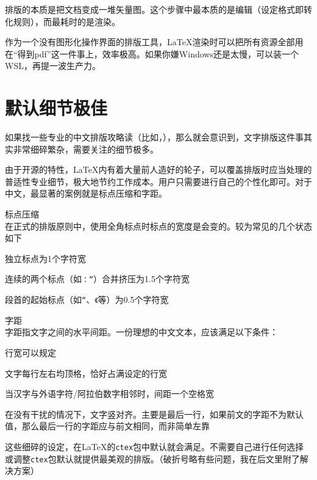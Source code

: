 \documentclass[10pt,openany]{book}
\begin{document}
\begin{sloppypar}
排版的本质是把文档变成一堆矢量图。这个步骤中最本质的是编辑（设定格式即转化规则），而最耗时的是渲染。

作为一个没有图形化操作界面的排版工具，{\LaTeX}渲染时可以把所有资源全部用在“得到pdf”这一件事上，效率极高。如果你嫌Windows还是太慢，可以装一个WSL，再提一波生产力。

\section{默认细节极佳}

如果找一些专业的中文排版攻略读（比如，），那么就会意识到，文字排版这件事其实非常细碎繁杂，需要关注的细节极多。

由于开源的特性，{\LaTeX}内有着大量前人造好的轮子，可以覆盖排版时应当处理的普适性专业细节，极大地节约工作成本。用户只需要进行自己的个性化即可。对于中文，最显著的案例就是标点压缩和字距。

\begin{tightitem}
    \item 标点压缩\\在正式的排版原则中，使用全角标点时标点的宽度是会变的。较为常见的几个状态如下
    \begin{tightenum}
        \item 独立标点为1个字符宽
        \item 连续的两个标点（如\texttt{：“}）合并挤压为1.5个字符宽
        \item 段首的起始标点（如\texttt{“}、\texttt{《}等）为0.5个字符宽
    \end{tightenum}
    \item 字距\\字距指文字之间的水平间距。一份理想的中文文本，应该满足以下条件：
    \begin{tightenum}
        \item 行宽可以规定
        \item 文字每行左右均顶格，恰好占满设定的行宽
        \item 当汉字与外语字符/阿拉伯数字相邻时，间距一个空格宽
        \item 在没有干扰的情况下，文字竖对齐。主要是最后一行，如果前文的字距不为默认值，那么最后一行的字距应与前文相同，而非简单左靠
    \end{tightenum}
\end{tightitem}

这些细碎的设定，在{\LaTeX}的\texttt{ctex}包中默认就会满足。不需要自己进行任何选择或调整\texttt{ctex}包默认就提供最美观的排版。（破折号略有些问题，我在后文里附了解决方案）


\end{sloppypar}
\end{document}
